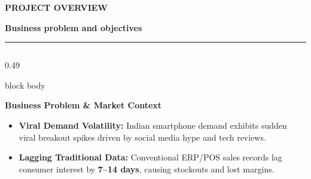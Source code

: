 \documentclass[aspectratio=169, 10pt]{beamer}
\newcommand{\slideheader}[3]{%
        \vspace{-0.25cm}%
        \noindent\begin{minipage}[t]{0.88\linewidth}%
            {\fontsize{7pt}{8.5pt}\selectfont \textbf{\color{BlueAccent}#1}}\par\vspace{1pt}%
            {\fontsize{11.5pt}{13.5pt}\selectfont \textbf{\color{NavyPrimary}#2}}%
        \end{minipage}%
        \hfill%
        \begin{minipage}[t]{0.10\linewidth}%
            \raggedleft{\fontsize{12pt}{14pt}\selectfont \textbf{\color{CoralAccent}#3}}%
        \end{minipage}\par%
        \vspace{2pt}%
        \textcolor{CardBorder}{\rule{\linewidth}{0.6pt}}\par%
        \vspace{3pt}%
    }
\newenvironment{card}[1][]{%
        \begin{beamercolorbox}[rounded=true,shadow=false,wd=\linewidth,sep=3.5pt,#1]{block body}%
        \fontsize{7.8pt}{9.8pt}\selectfont%
    }{%
        \end{beamercolorbox}%
    }
\begin{document}
    \begin{frame}[t]                                                                                                                                                                                   
        \slideheader{PROJECT OVERVIEW}{Business problem and objectives}{02}                                                                                                                            
        \begin{columns}[T]                                                                                                                                                                             
            \begin{column}{0.49\textwidth}                                                                                                                                                             
                \begin{card}                                                                                                                                                                           
                    \textbf{\color{NavyPrimary}Business Problem \& Market Context}\\[0.03cm]                                                                                                           
                    \begin{itemize}\setlength{\itemsep}{1.2pt}                                                                                                                                         
                        \item \textbf{Viral Demand Volatility:} Indian smartphone demand exhibits sudden viral breakout spikes driven by social media hype and tech reviews.                           
                        \item \textbf{Lagging Traditional Data:} Conventional ERP/POS sales records lag consumer interest by \textbf{7--14 days}, causing stockouts and lost margins.                  

\end{itemize}
\end{card}
\end{column}
\end{columns}
\end{frame}
\end{document}
